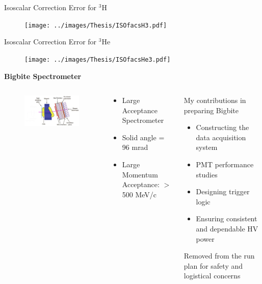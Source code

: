\documentclass[12pt,usenames,dvipsnames]{beamer}
\begin{document}
\begin{frame}{Isoscalar Correction Error for $^3$H  }
\vspace{-1.25cm}
\begin{figure}
	\texttt{[image: ../images/Thesis/ISOfacsH3.pdf]}
\end{figure}
\end{frame}
\begin{frame}{Isoscalar Correction Error for $^3$He }
\vspace{-1.25cm}
\begin{figure}
	\texttt{[image: ../images/Thesis/ISOfacsHe3.pdf]}
\end{figure}
\end{frame}


\begin{frame}
\centering 
\textbf{Bigbite Spectrometer}
\begin{columns}
	
	\begin{figure}
		\hspace*{-1.4cm}	\includegraphics[width=7cm]{../images/Thesis/BigBite1.png}
	\end{figure}
	\begin{block}{}
		\begin{itemize}
			\item[] \noindent Large Acceptance Spectrometer
			\item Solid angle = 96 mrad
			\item Large Momentum Acceptance: $>$ 500 MeV/c
		\end{itemize}
	\end{block}
	
	\hspace*{0.5cm}
	\begin{block}{My contributions in preparing Bigbite}
		\begin{itemize}
			\item Constructing the data acquisition system
			\item PMT performance studies
			\item Designing trigger logic
			\item Ensuring consistent and dependable HV power
		\end{itemize}
		Removed from the run plan for safety and logistical concerns
	\end{block}
\end{columns}
\end{frame}
\end{document}
